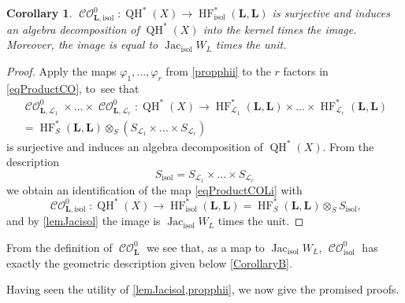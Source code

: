 \documentclass[JEP,XML,SOM,Unicode,NoEqCountersInSection,NoFloatCountersInSection,published]{cedram}
\newtheorem{corollary}[theorem]{Corollary}
\theoremstyle{definition}
\let\phi\varphi
\newcommand{\calL}{\mathcal{L}}
\newcommand{\bL}{{\boldsymbol{L}}}
\newcommand{\isol}{\mathrm{isol}}
\newcommand{\HF}{\operatorname{HF}}
\newcommand{\CO}{\operatorname{\mathcal{CO}}}
\newcommand{\QH}{\operatorname{QH}}
\newcommand{\Jacisol}{\operatorname{Jac}_\isol}
\newcommand{\COisol}{\CO^0_{\bL, \isol}}
\begin{document}
\begin{corollary}
\label{corThmA}
$\COisol : \QH^*(X) \to \HF^*_\isol(\bL, \bL)$ is surjective and induces an algebra decomposition of $\QH^*(X)$ into the kernel times the image. Moreover, the image is equal to $\Jacisol W_L$ times the unit.
\end{corollary}

\begin{proof}
Apply the maps $\phi_1, \dots, \phi_r$ from \cref{propphii} to the $r$ factors in \eqref{eqProductCO}, to~see that
\begin{multline}
\label{eqProductCOLi}
\CO^0_{\bL, \calL_1} \times \dots \times \CO^0_{\bL, \calL_r} : \QH^*(X) \to \HF^*_{\calL_1}(\bL, \bL) \times \dots \times \HF^*_{\calL_r}(\bL, \bL)
\\ = \HF^*_S(\bL, \bL) \otimes_S (S_{\calL_1} \times \dots \times S_{\calL_r})
\end{multline}
is surjective and induces an algebra decomposition of $\QH^*(X)$. From the description
\[
S_\isol = S_{\calL_1} \times \dots \times S_{\calL_r}
\]
we obtain an identification of the map \eqref{eqProductCOLi} with
\[
\CO^0_{\bL,\isol} : \QH^*(X) \to \HF^*_\isol(\bL, \bL) = \HF^*_S(\bL, \bL) \otimes_S S_\isol,
\]
and by \cref{lemJacisol} the image is $\Jacisol W_L$ times the unit.
\end{proof}

From the definition of $\CO^0_\bL$ we see that, as a map to $\Jacisol W_L$, $\CO^0_\isol$ has exactly the geometric description given below \cref{CorollaryB}.

Having seen the utility of \cref{lemJacisol,propphii}, we now give the promised proofs.
\end{document}
